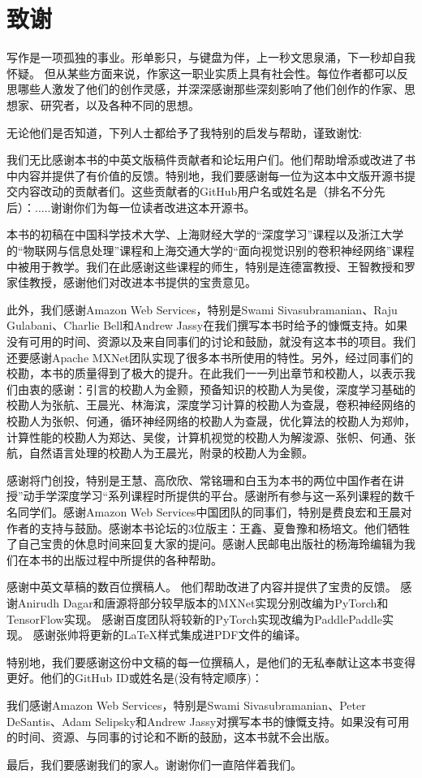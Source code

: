 \chapter*{ 致谢}

写作是一项孤独的事业。形单影只，与键盘为伴，上一秒文思泉涌，下一秒却自我怀疑。
但从某些方面来说，作家这一职业实质上具有社会性。每位作者都可以反思哪些人激发了他们的创作灵感，并深深感谢那些深刻影响了他们创作的作家、思想家、研究者，以及各种不同的思想。

无论他们是否知道，下列人士都给予了我特别的启发与帮助，谨致谢忱:

我们无比感谢本书的中英文版稿件贡献者和论坛用户们。他们帮助增添或改进了书中内容并提供了有价值的反馈。特别地，我们要感谢每一位为这本中文版开源书提交内容改动的贡献者们。这些贡献者的GitHub用户名或姓名是（排名不分先后）：.....谢谢你们为每一位读者改进这本开源书。

本书的初稿在中国科学技术大学、上海财经大学的“深度学习”课程以及浙江大学的“物联网与信息处理”课程和上海交通大学的“面向视觉识别的卷积神经网络”课程中被用于教学。我们在此感谢这些课程的师生，特别是连德富教授、王智教授和罗家佳教授，感谢他们对改进本书提供的宝贵意见。

此外，我们感谢Amazon Web Services，特别是Swami Sivasubramanian、Raju Gulabani、Charlie Bell和Andrew Jassy在我们撰写本书时给予的慷慨支持。如果没有可用的时间、资源以及来自同事们的讨论和鼓励，就没有这本书的项目。我们还要感谢Apache MXNet团队实现了很多本书所使用的特性。另外，经过同事们的校勘，本书的质量得到了极大的提升。在此我们一一列出章节和校勘人，以表示我们由衷的感谢：引言的校勘人为金颢，预备知识的校勘人为吴俊，深度学习基础的校勘人为张航、王晨光、林海滨，深度学习计算的校勘人为查晟，卷积神经网络的校勘人为张帜、何通，循环神经网络的校勘人为查晟，优化算法的校勘人为郑帅，计算性能的校勘人为郑达、吴俊，计算机视觉的校勘人为解浚源、张帜、何通、张航，自然语言处理的校勘人为王晨光，附录的校勘人为金颢。

感谢将门创投，特别是王慧、高欣欣、常铭珊和白玉为本书的两位中国作者在讲授”动手学深度学习“系列课程时所提供的平台。感谢所有参与这一系列课程的数千名同学们。感谢Amazon Web Services中国团队的同事们，特别是费良宏和王晨对作者的支持与鼓励。感谢本书论坛的3位版主：王鑫、夏鲁豫和杨培文。他们牺牲了自己宝贵的休息时间来回复大家的提问。感谢人民邮电出版社的杨海玲编辑为我们在本书的出版过程中所提供的各种帮助。


感谢中英文草稿的数百位撰稿人。
他们帮助改进了内容并提供了宝贵的反馈。
感谢Anirudh Dagar和唐源将部分较早版本的MXNet实现分别改编为PyTorch和TensorFlow实现。 
感谢百度团队将较新的PyTorch实现改编为PaddlePaddle实现。 
感谢张帅将更新的LaTeX样式集成进PDF文件的编译。

特别地，我们要感谢这份中文稿的每一位撰稿人，是他们的无私奉献让这本书变得更好。他们的GitHub ID或姓名是(没有特定顺序)：

我们感谢Amazon Web Services，特别是Swami Sivasubramanian、Peter DeSantis、Adam Selipsky和Andrew Jassy对撰写本书的慷慨支持。如果没有可用的时间、资源、与同事的讨论和不断的鼓励，这本书就不会出版。


最后，我们要感谢我们的家人。谢谢你们一直陪伴着我们。

\newpage
